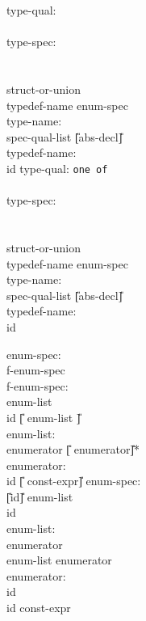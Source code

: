 \begin{center}
\PAIR
{
type-qual:  \\
\> 	 \\
type-spec:  \\
\>	    \\
\>          \\
\>	   struct-or-union \\
\>	typedef-name enum-spec\\
type-name: \\
\>	spec-qual-list \U{[}abs-decl\U{]}\\
typedef-name: \\
\>	id
}
{
type-qual: {\tt one of} \\
\>	  \\ 
type-spec:  \\
\>	    \\
\>          \\
\>	   struct-or-union \\
\>	typedef-name enum-spec \\
type-name: \\
\>	spec-qual-list \U{[}abs-decl\U{]}\\
typedef-name: \\
\>	id
}

\PAIR
{
enum-spec:\\
\>	 f-enum-spec\\
f-enum-spec:\\
\>	\T{\{} enum-list \T{\}}\\
\>	id \U{[}\T{\{} enum-list \T{\}}\U{]}\\
enum-list:\\
\>	enumerator \U{[}\T{,} enumerator\U{]}*\\
enumerator:\\
\>	id \U{[}\T{=} const-expr\U{]}
}
{
enum-spec:\\
\>	 \U{[}id\U{]} \T{\{}enum-list\T{\}}\\
\>	 id\\
enum-list:\\
\>	enumerator\\
\>	enum-list \T{,} enumerator\\
enumerator:\\
\>	id\\
\>	id \T{=} const-expr
}



\end{center}
